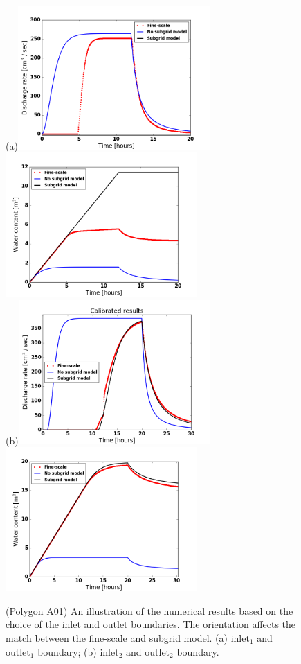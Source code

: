 \documentclass[review,11pt]{elsarticle}
\begin{document}
\begin{figure}[!h]
\centering
(a)\includegraphics[width=6.cm, height=5.5cm]{./figures/POLYGON_A01/POLYGON_A01discharge.png}
\includegraphics[width=6.cm, height=5.5cm]{./figures/POLYGON_A01/POLYGON_A01watercontent.png}\\
(b)\includegraphics[width=6.cm, height=5.5cm]{./figures/POLYGON_A01/POLYGON_A01discharge-CalibDDManningTest3.png}
\includegraphics[width=6.cm, height=5.5cm]{./figures/POLYGON_A01/POLYGON_A01WC-CalibDDManningTest3.png}
\caption{(Polygon A01) An illustration of the numerical results based on the choice of the inlet and outlet boundaries. The orientation affects the match between the fine-scale and subgrid model. (a) inlet$_1$ and outlet$_1$ boundary; (b) inlet$_2$ and outlet$_2$  boundary.}
\label{polygon-A01-fig2}
\end{figure}
\end{document}
